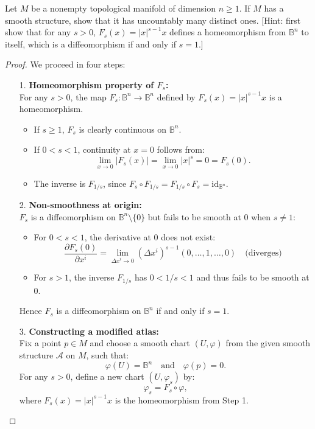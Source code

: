 \begin{problem}
  Let $M$ be a nonempty topological manifold of dimension $n \geq 1$. If $M$ has
  a smooth structure, show that it has uncountably many distinct ones. [Hint:
  first show that for any $s>0$, $F_s(x) = |x|^{s-1}x$ defines a homeomorphism
  from $\mathbb{B}^n$ to itself, which is a diffeomorphism if and only if $s = 1$.]

  \begin{proof}
    We proceed in four steps:

    \begin{enumerate}
      \item[1.] \textbf{Homeomorphism property of $F_s$:} \\
      For any $s>0$, the map $F_s \colon \mathbb{B}^n \rightarrow \mathbb{B}^n$ defined by $F_s(x) = |x|^{s-1}x$ is a homeomorphism.
      \begin{itemize}
        \item If $s \geq 1$, $F_s$ is clearly continuous on $\mathbb{B}^n$.
        \item If $0 < s < 1$, continuity at $x=0$ follows from:
        $$ \lim_{x \to 0}|F_s(x)| = \lim_{x \to 0}|x|^s = 0 = F_s(0). $$
        \item The inverse is $F_{1/s}$, since $F_s \circ F_{1/s} = F_{1/s} \circ F_s = \text{id}_{\mathbb{B}^n}$.
      \end{itemize}

      \item[2.] \textbf{Non-smoothness at origin:} \\
      $F_s$ is a diffeomorphism on $\mathbb{B}^n \setminus \{0\}$ but fails to be smooth at $0$ when $s \neq 1$:
      
\begin{itemize}
        \item For $0 < s < 1$, the derivative at $0$ does not exist:
        $$ \frac{\partial F_s(0)}{\partial x^i} = \lim_{\Delta x^i \to 0} (\Delta x^i)^{s-1}(0,\ldots,1,\ldots,0) \quad \text{(diverges)} $$
        \item For $s>1$, the inverse $F_{1/s}$ has $0<1/s<1$ and thus fails to be smooth at $0$.
      \end{itemize}
      Hence $F_s$ is a diffeomorphism on $\mathbb{B}^n$ if and only if $s=1$.

      \item[3.] \textbf{Constructing a modified atlas:} \\
      Fix a point $p \in M$ and choose a smooth chart $(U, \varphi)$ from the given smooth structure $\mathcal{A}$ on $M$, such that:
      $$     \varphi(U) = \mathbb{B}^n \quad \text{and} \quad \varphi(p) = 0.     $$
      For any $s > 0$, define a new chart $(U, \varphi_s)$ by:
      $$     \varphi_s = F_s \circ \varphi,     $$
      where $F_s(x) = |x|^{s-1}x$ is the homeomorphism from Step 1.
  

\end{enumerate}
\end{proof}
\end{problem}
